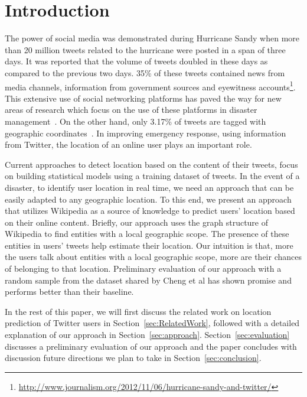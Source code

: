 \section{Introduction}
\label{sec:Introduction}

The power of social media was demonstrated during Hurricane Sandy when more than 20 million tweets related to the hurricane were posted in a span of three days. It was reported that the volume of tweets doubled in these days as compared to the previous two days. 35\% of these tweets contained news from media channels, information from government sources and eyewitness accounts\footnote{\url{http://www.journalism.org/2012/11/06/hurricane-sandy-and-twitter/}}. This extensive use of social networking platforms has paved the way for new areas of research which focus on the use of these platforms in disaster management~\cite{purohit2013emergency}. On the other hand, only  3.17\% of tweets are tagged with geographic coordinates~\cite{morstatter2013sample}. In improving emergency response, using information from Twitter, the location of an online user plays an important role. 

Current approaches to detect location based on the content of their tweets, focus on building statistical models using a training dataset of tweets.
In the event of a disaster, to identify user location in real time, we need an approach that can be easily adapted to any geographic location. To this end, we present an approach that utilizes Wikipedia as a source of knowledge to predict users' location based on their online content. Briefly, our approach uses the graph structure of Wikipedia to find entities with a local geographic scope. The presence of these entities in users' tweets help estimate their location. Our intuition is that, more the users talk about entities with a local geographic scope, more are their chances of belonging to that location. Preliminary evaluation of our approach with a random sample from the dataset shared by Cheng et al\cite{cheng2010you} has shown promise and performs better than their baseline.   

In the rest of this paper, we will first discuss the related work on location prediction of Twitter users in Section~\ref{sec:RelatedWork}, followed with a detailed explanation of our approach in Section~\ref{sec:approach}. Section~\ref{sec:evaluation} discusses a preliminary evaluation of our approach and the paper concludes with discussion future directions we plan to take in Section~\ref{sec:conclusion}. 